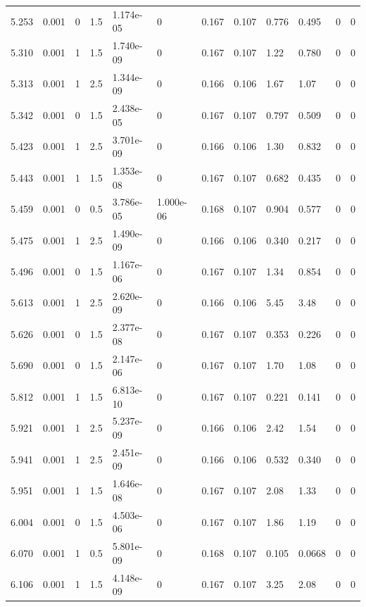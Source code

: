 \documentclass[preview]{standalone}
\begin{document}
{{{{\begin{tabular}{L{1.2cm}C{1.2cm} C{0.3cm}C{0.5cm} C{1.4cm}C{1.4cm} C{1.4cm}C{1.4cm} C{1.6cm}C{1.6cm} C{1.6cm}C{1.6cm}}
  5.253  &  0.001  & 0     & 1.5 &  1.174e-05  & 0  &  0.167&   0.107& 0.776 & 0.495   &  0 & 0  \\ 
  5.310  &  0.001  & 1     & 1.5 &  1.740e-09  & 0  &  0.167&   0.107& 1.22 & 0.780   &  0 & 0  \\ 
  5.313  &  0.001  & 1     & 2.5 &  1.344e-09  & 0  &  0.166&   0.106& 1.67 & 1.07   &  0 & 0  \\ 
  5.342  &  0.001  & 0     & 1.5 &  2.438e-05  & 0  &  0.167&   0.107& 0.797 & 0.509   &  0 & 0  \\ 
  5.423  &  0.001  & 1     & 2.5 &  3.701e-09  & 0  &  0.166&   0.106& 1.30 & 0.832   &  0 & 0  \\ 
  5.443  &  0.001  & 1     & 1.5 &  1.353e-08  & 0  &  0.167&   0.107& 0.682 & 0.435   &  0 & 0  \\ 
  5.459  &  0.001  & 0     & 0.5 &  3.786e-05  & 1.000e-06  &  0.168&   0.107& 0.904 & 0.577   &  0 & 0  \\ 
  5.475  &  0.001  & 1     & 2.5 &  1.490e-09  & 0  &  0.166&   0.106& 0.340 & 0.217   &  0 & 0  \\ 
  5.496  &  0.001  & 0     & 1.5 &  1.167e-06  & 0  &  0.167&   0.107& 1.34 & 0.854   &  0 & 0  \\ 
  5.613  &  0.001  & 1     & 2.5 &  2.620e-09  & 0  &  0.166&   0.106& 5.45 & 3.48   &  0 & 0  \\ 
  5.626  &  0.001  & 0     & 1.5 &  2.377e-08  & 0  &  0.167&   0.107& 0.353 & 0.226   &  0 & 0  \\ 
  5.690  &  0.001  & 0     & 1.5 &  2.147e-06  & 0  &  0.167&   0.107& 1.70 & 1.08   &  0 & 0  \\ 
  5.812  &  0.001  & 1     & 1.5 &  6.813e-10  & 0  &  0.167&   0.107& 0.221 & 0.141   &  0 & 0  \\ 
  5.921  &  0.001  & 1     & 2.5 &  5.237e-09  & 0  &  0.166&   0.106& 2.42 & 1.54   &  0 & 0  \\ 
  5.941  &  0.001  & 1     & 2.5 &  2.451e-09  & 0  &  0.166&   0.106& 0.532 & 0.340   &  0 & 0  \\ 
  5.951  &  0.001  & 1     & 1.5 &  1.646e-08  & 0  &  0.167&   0.107& 2.08 & 1.33   &  0 & 0  \\ 
  6.004  &  0.001  & 0     & 1.5 &  4.503e-06  & 0  &  0.167&   0.107& 1.86 & 1.19   &  0 & 0  \\ 
  6.070  &  0.001  & 1     & 0.5 &  5.801e-09  & 0  &  0.168&   0.107& 0.105 & 0.0668   &  0 & 0  \\ 
  6.106  &  0.001  & 1     & 1.5 &  4.148e-09  & 0  &  0.167&   0.107& 3.25 & 2.08   &  0 & 0  \\ 

\end{tabular}}}}}
\end{document}
